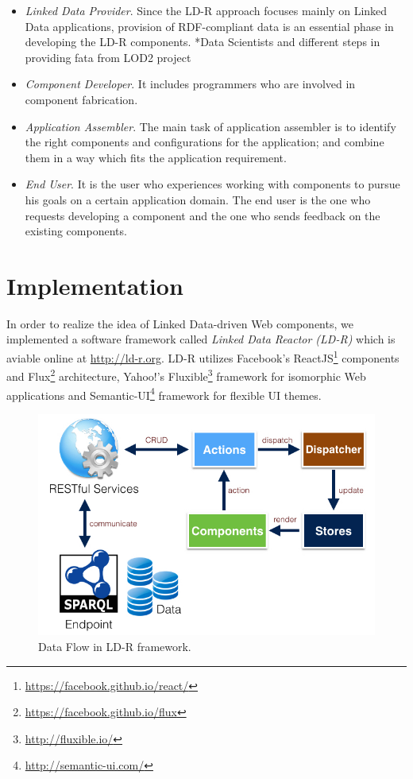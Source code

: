 \documentclass{acm_proc_article-sp}
\begin{document}
\begin{itemize}

\item \emph{Linked Data Provider}.
Since the LD-R approach focuses mainly on Linked Data applications, provision of RDF-compliant data is an essential phase in developing the LD-R components.
*Data Scientists and different steps in providing fata from LOD2 project

\item \emph{Component Developer}. 
It includes programmers who are involved in component fabrication.


\item \emph{Application Assembler}.
The main task of application assembler is to identify the right components and configurations for the application; and combine them in a way which fits the application requirement. 

\item \emph{End User}. 
It is the user who experiences working with components to pursue his goals on a certain application domain.
The end user is the one who requests developing a component and the one who sends feedback on the existing components.

\end{itemize}

\section{Implementation}

In order to realize the idea of Linked Data-driven Web components, we implemented a software framework called \emph{Linked Data Reactor (LD-R)} which is aviable online at \url{http://ld-r.org}.
LD-R utilizes Facebook's ReactJS\footnote{\url{https://facebook.github.io/react/}} components and Flux\footnote{\url{https://facebook.github.io/flux}} architecture, Yahoo!'s Fluxible\footnote{\url{http://fluxible.io/}} framework for isomorphic Web applications and Semantic-UI\footnote{\url{http://semantic-ui.com/}} framework for flexible UI themes.


\begin{figure}[tb]
  \includegraphics[width=.9\linewidth]{images/dataflow.jpg}
  \caption{Data Flow in LD-R framework.}
  \label{fig:dataflow}
\end{figure}
\end{document}
